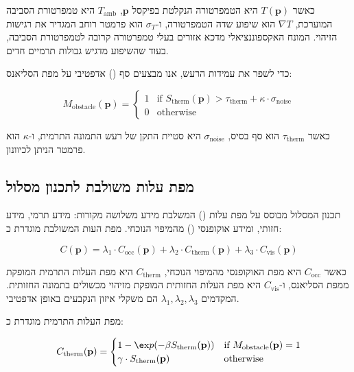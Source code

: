 כאשר $T(\mathbf{p})$ היא הטמפרטורה הנקלטת בפיקסל $\mathbf{p}$, $T_{\text{amb}}$ היא טמפרטורת הסביבה המוערכת, $\nabla T$ הוא שיפוע שדה הטמפרטורה, ו-$\sigma_T$ הוא פרמטר רוחב המגדיר את רגישות הזיהוי. המונח האקספוננציאלי מדכא אזורים בעלי טמפרטורה קרובה לטמפרטורת הסביבה, בעוד שהשיפוע מדגיש גבולות תרמיים חדים.

כדי לשפר את עמידות הרעש, אנו מבצעים סף () אדפטיבי על מפת הסליאנס:

\begin{equation}
M_{\text{obstacle}}(\mathbf{p}) = \begin{cases} 1 & \text{if } S_{\text{therm}}(\mathbf{p}) > \tau_{\text{therm}} + \kappa \cdot \sigma_{\text{noise}} \\ 0 & \text{otherwise} \end{cases}
\label{eq:ch06_threshold}
\end{equation}

כאשר $\tau_{\text{therm}}$ הוא סף בסיס, $\sigma_{\text{noise}}$ היא סטיית התקן של רעש התמונה התרמית, ו-$\kappa$ הוא פרמטר הניתן לכיוונון.

\subsection{מפת עלות משולבת לתכנון מסלול}
\label{sec:ch06_cost_map}

תכנון המסלול מבוסס על מפת עלות () המשלבת מידע משלושה מקורות: מידע תרמי, מידע חזותי, ומידע אוקופנסי () מהמיפוי הנוכחי. מפת העות המשולבת מוגדרת כ:

\begin{equation}
C(\mathbf{p}) = \lambda_1 \cdot C_{\text{occ}}(\mathbf{p}) + \lambda_2 \cdot C_{\text{therm}}(\mathbf{p}) + \lambda_3 \cdot C_{\text{vis}}(\mathbf{p})
\label{eq:ch06_cost_map}
\end{equation}

כאשר $C_{\text{occ}}$ היא מפת האוקופנסי מהמיפוי הנוכחי, $C_{\text{therm}}$ היא מפת העלות התרמית המופקת ממפת הסליאנס, ו-$C_{\text{vis}}$ היא מפת העלות החזותית המופקת מזיהוי מכשולים בתמונה החזותית. המקדמים $\lambda_1, \lambda_2, \lambda_3$ הם משקלי איזון הנקבעים באופן אדפטיבי.

מפת העלות התרמית מוגדרת כ:

\begin{equation}
C_{\text{therm}}(\mathbf{p}) = \begin{cases} 1 - \e$x$p(-\beta S_{\text{therm}}(\mathbf{p})$$) & \text{if } M_{\text{obstacle}}(\mathbf{p}) = 1 \\ \gamma \cdot S_{\text{therm}}(\mathbf{p}) & \text{otherwise} \end{cases}
\label{eq:ch06_thermal_cost}
\end{equation}

